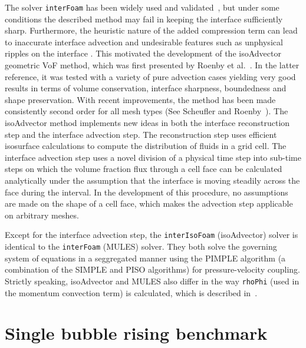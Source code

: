 \documentclass[review]{elsarticle}
\begin{document}
The solver \verb+interFoam+ has been widely used and validated~\cite{MARSCHALL2012,RAEINI2012,HOANG2013,BILGER2017}, but under some conditions the described method may fail in keeping the interface sufficiently sharp. Furthermore, the heuristic nature of the added compression term can lead to inaccurate interface advection and undesirable features such as unphysical ripples on the interface \cite{roenby_new_2017,roenby_isoadvector:_2018}. This motivated the development of the isoAdvector geometric VoF method, which was first presented by Roenby et al.~\cite{Roenby160405}. In the latter reference, it was tested with a variety of pure advection cases yielding very good results in terms of volume conservation, interface sharpness, boundedness and shape preservation. 
With recent improvements, the method has been made consistently second order for all mesh types (See Scheufler and Roenby~\cite{Scheufler2018}). The isoAdvector method implements new ideas in both the interface reconstruction step and the interface advection step.
The reconstruction step uses efficient isosurface calculations to compute the distribution
of fluids in a grid cell. The interface advection step uses a novel division of
a physical time step into sub-time steps on which the volume fraction flux through a 
cell face can be calculated analytically under the assumption that the interface is moving 
steadily across the face during the interval. In the development of this procedure, 
no assumptions are made on the shape of a cell face, which makes the advection step 
applicable on arbitrary meshes.

Except for the interface advection step, the \verb+interIsoFoam+ (isoAdvector) solver is identical to the \verb+interFoam+ (MULES) solver. They both solve the governing system of equations in a seggregated manner using the PIMPLE algorithm (a combination of the SIMPLE and PISO algorithms) for pressure-velocity coupling. 
Strictly speaking, isoAdvector and MULES also differ in the way \verb+rhoPhi+ (used in the momentum convection term) is calculated, which is described in~\cite{roenby_isoadvector:_2018}.

\section{Single bubble rising benchmark}\label{sec_hysingcase}
\end{document}
